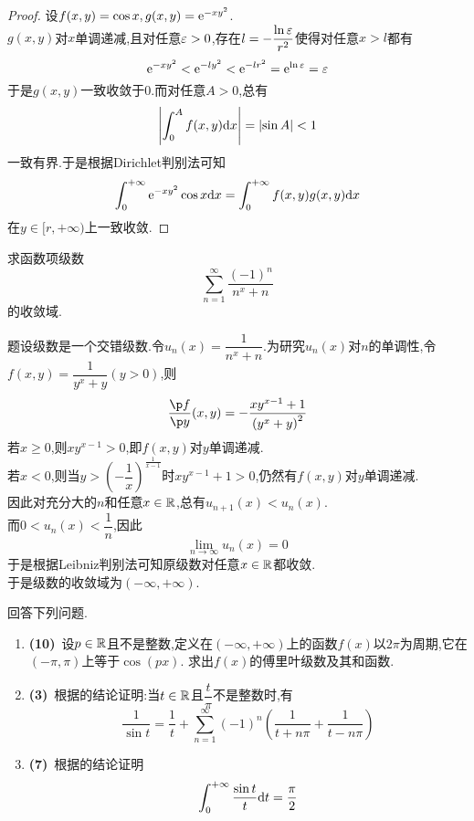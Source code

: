 \documentclass{ctexart}
\begin{document}
\begin{proof}
    设$f(x,y)=\cos x,g(x,y)=\mathrm{e}^{-xy^2}$.\\
    $g(x,y)$对$x$单调递减,且对任意$\varepsilon>0$,存在$l=-\dfrac{\ln\varepsilon}{r^2}$使得对任意$x>l$都有
    \[\mathrm{e}^{-xy^2}<\mathrm{e}^{-ly^2}<\mathrm{e}^{-lr^2}=\mathrm{e}^{\ln\varepsilon}=\varepsilon\]
    于是$g(x,y)$一致收敛于$0$.而对任意$A>0$,总有
    \[\left|\int_0^{A}f(x,y)\mathrm{d} x\right|=\left|\sin A\right|<1\]
    一致有界.于是根据Dirichlet判别法可知
    \[\int_0^{+\infty}\mathrm{e}^{-xy^2}\cos x\mathrm{d} x=\int_0^{+\infty}f(x,y)g(x,y)\mathrm{d} x\]
    在$y\in[r,+\infty)$上一致收敛.
\end{proof}
\begin{problem}[5.(10\songti{分})]
    求函数项级数
    \[\sum_{n=1}^\infty\dfrac{(-1)^n}{n^x+n}\]
    的收敛域.
\end{problem}
\begin{solution}
    题设级数是一个交错级数.令$u_n(x)=\dfrac{1}{n^x+n}$.为研究$u_n(x)$对$n$的单调性,令$f(x,y)=\dfrac{1}{y^x+y}(y>0)$,则
    \[\dfrac{\p f}{\p y}(x,y)=-\dfrac{xy^{x-1}+1}{\left(y^x+y\right)^2}\]
    若$x\geqslant0$,则$xy^{x-1}>0$,即$f(x,y)$对$y$单调递减.\\
    若$x<0$,则当$y>\left(-\dfrac{1}{x}\right)^{\frac{1}{x-1}}$时$xy^{x-1}+1>0$,仍然有$f(x,y)$对$y$单调递减.\\
    因此对充分大的$n$和任意$x\in\mathbb{R}$,总有$u_{n+1}(x)<u_n(x)$.\\
    而$0<u_n(x)<\dfrac{1}{n}$,因此
    \[\lim_{n\to\infty}u_n(x)=0\]
    于是根据Leibniz判别法可知原级数对任意$x\in\mathbb{R}$都收敛.\\
    于是级数的收敛域为$(-\infty,+\infty)$.
\end{solution}
\begin{problem}[6.(20\songti{分})]
    回答下列问题.
    \begin{enumerate}[label=\tbf{(\arabic*)},topsep=0pt,parsep=0pt,itemsep=0pt,partopsep=0pt]
        \item \textbf{(10)}\ 设$p\in\mathbb{R}$且不是整数,定义在$(-\infty,+\infty)$上的函数$f(x)$以$2\pi$为周期,它在$(-\pi,\pi)$上等于$\cos(px)$.%
            求出$f(x)$的傅里叶级数及其和函数.
        \item \textbf{(3)}\ 根据的结论证明:当$t\in\mathbb{R}$且$\dfrac{t}{\pi}$不是整数时,有
            \[\dfrac{1}{\sin t}=\dfrac1t+\sum_{n=1}^{\infty}(-1)^n\left(\dfrac{1}{t+n\pi}+\dfrac{1}{t-n\pi}\right)\]
        \item \textbf{(7)}\ 根据的结论证明
            \[\int_0^{+\infty}\dfrac{\sin t}{t}\mathrm{d} t=\dfrac\pi2\]

    \end{enumerate}
\end{problem}
\end{document}
